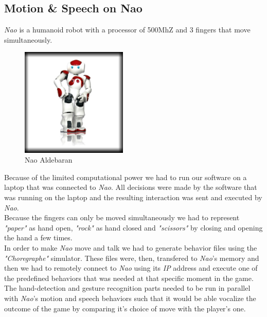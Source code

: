 \documentclass[a4paper, 11pt, twocolumn]{article}
\begin{document}
        \subsection{Motion \& Speech on Nao}
		\label{sec:Meth_naoPlay}
		\emph{Nao} is a humanoid robot with a processor of 500MhZ and 3 fingers that move simultaneously.\\
		\begin{figure}[!hbtp]
		 	\centering
			\includegraphics[width=0.45\textwidth]{Nao.png}
		 	\caption{Nao Aldebaran}
	   	\end{figure}			
		\hspace*{10px}Because of the limited computational power we had to run our software on a laptop that was connected to \emph{Nao}. All decisions were made by the software that was running on the laptop and the resulting interaction was sent and executed by \emph{Nao}.\\
		\hspace*{10px}Because the fingers can only be moved simultaneously we had to represent \emph{"paper"} as hand open, \emph{"rock"} as hand closed and \emph{"scissors"} by closing and opening the hand a few times.\\
		\hspace*{10px}In order to make \emph{Nao} move and talk we had to generate behavior files using the \emph{"Choregraphe"} simulator. These files were, then, transfered to \emph{Nao}\rq s memory and then we had to remotely connect to \emph{Nao} using its \emph{IP} address and execute one of the predefined behaviors that was needed at that specific moment in the game.\\  
        \hspace*{10px}The hand-detection and gesture recognition parts needed to be run in parallel with \emph{Nao}\rq s motion and speech behaviors such that it would be able vocalize the outcome of the game by comparing it\rq s choice of move with the player\rq s one.
\end{document}
